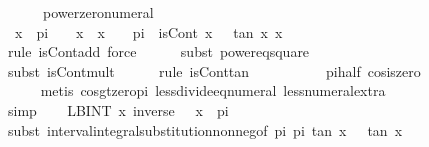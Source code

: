 \documentclass{article}
\theoremstyle{definition}
\begin{document}
\begin{figure}
\begin{isabellebody}
\ \ \ \ \ \ power{\isacharunderscore}zero{\isacharunderscore}numeral{\isacharparenright}\isanewline
\ \ \isamarkupfalse%
\ {}{\isacharcolon}\ {\isachardoublequoteopen}{\isasymAnd}x{\isachardot}\ {\isacharminus}\ {\isacharparenleft}pi\ {\isacharslash}\ {}{\isacharparenright}\ {\isacharless}\ x\ {\isasymLongrightarrow}\ x\ {\isacharasterisk}\ {}\ {\isacharless}\ pi\ {\isasymLongrightarrow}\ isCont\ {\isacharparenleft}{\isasymlambda}x{\isachardot}\ {}\ {\isacharplus}\ {\isacharparenleft}tan\ x{\isacharparenright}\ x{\isachardoublequoteclose}\isanewline
\ \ \ \ \isamarkupfalse%
\ {\isacharparenleft}rule\ isCont{\isacharunderscore}add{\isacharcomma}\ force{\isacharparenright}\isanewline
\ \ \ \ \isamarkupfalse%
\ {\isacharparenleft}subst\ power{}{\isacharunderscore}eq{\isacharunderscore}square{\isacharparenright}\isanewline
\ \ \ \ \isamarkupfalse%
\ {\isacharparenleft}subst\ isCont{\isacharunderscore}mult{\isacharparenright}\isanewline
\ \ \ \ \isamarkupfalse%
\ {\isacharparenleft}rule\ isCont{\isacharunderscore}tan{\isacharparenright}\isanewline
\ \ \ \ \isanewline
\ \ \ \ \isamarkupfalse%
\ pi{\isacharunderscore}half\ cos{\isacharunderscore}is{\isacharunderscore}zero\isanewline
\ \ \ \ \isamarkupfalse%
\ {\isacharparenleft}metis\ cos{\isacharunderscore}gt{\isacharunderscore}zero{\isacharunderscore}pi\ less{\isacharunderscore}divide{\isacharunderscore}eq{\isacharunderscore}numeral{}{\isacharparenleft}{}{\isacharparenright}\ less{\isacharunderscore}numeral{\isacharunderscore}extra{\isacharparenleft}{}{\isacharparenright}{\isacharparenright}\isanewline
\ \ \ \ \isamarkupfalse%
\ simp\isanewline
\ \ \isamarkupfalse%
\ {\isachardoublequoteopen}LBINT\ x{\isacharequal}{\isacharminus}{\isasyminfinity}{\isachardot}{\isachardot}{\isasyminfinity}{\isachardot}\ inverse\ {\isacharparenleft}{}\ {\isacharplus}\ x{\isacharcircum}{}{\isacharparenright}\ {\isacharequal}\ pi{\isachardoublequoteclose}\isanewline
\ \ \ \ \isamarkupfalse%
\ {\isacharparenleft}subst\ interval{\isacharunderscore}integral{\isacharunderscore}substitution{\isacharunderscore}nonneg{\isacharbrackleft}of\ {\isachardoublequoteopen}{\isacharminus}pi{\isacharslash}{}{\isachardoublequoteclose}\ {\isachardoublequoteopen}pi{\isacharslash}{}{\isachardoublequoteclose}\ tan\ {\isachardoublequoteopen}{\isasymlambda}x{\isachardot}\ {}\ {\isacharplus}\ {\isacharparenleft}tan\ x{\isacharparenright}{\isacharcircum}{}{\isachardoublequoteclose}{\isacharbrackright}{\isacharparenright}\isanewline

\end{isabellebody}
\end{figure}
\end{document}
